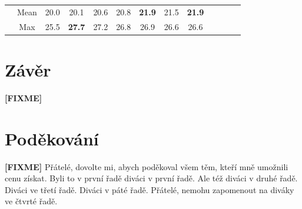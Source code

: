 \documentclass[fleqn,11pt]{ExcelAtFIT} %
\newcommand{\fixme}[1]{{\color{fixme} {{\textbf{[FIXME]}} #1} }}
\begin{document}
\begin{table}[t!]
\begin{tabular}{| c | c | c| c | c | c | c | c | c | c | c | c | c |}
         &Mean& 20.0 & 20.1  & 20.6
         & 20.8 & {\bf 21.9} & 21.5 & {\bf 21.9} \\ %

         &\textcolor{grayintable}{Max}& \textcolor{grayintable}{25.5} & \textcolor{grayintable}{{\bf 27.7}}  & \textcolor{grayintable}{27.2}
         & \textcolor{grayintable}{26.8} & \textcolor{grayintable}{26.9} & \textcolor{grayintable}{26.6}& \textcolor{grayintable}{26.6} \\ \hline

        \end{tabular}
\end{table}


\section{Závěr}
\label{sec:Conclusions}

\fixme{\blindtext}


\section*{Poděkování}
\label{sec:Acknowledgements}


\fixme{Přátelé, dovolte mi, abych poděkoval všem těm, kteří mně umožnili cenu získat. Byli to v první řadě diváci v první řadě. Ale též diváci v druhé řadě. Diváci ve třetí řadě. Diváci v páté řadě. Přátelé, nemohu zapomenout na diváky ve čtvrté řadě.}





\end{document}
